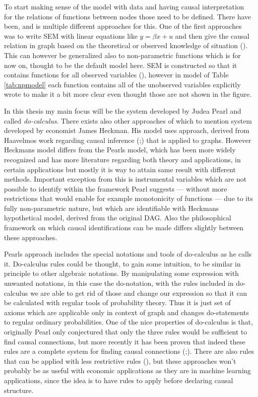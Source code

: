 \documentclass[main=english,12pt,a4paper,pdftex,econ,utf8]{aaltothesis}
\begin{document}
To start making sense of the model with data and having causal interpretation for the relations of functions between nodes those need to be defined. There have been, and is multiple different approaches for this. One of the first approaches was to write SEM with linear equations like $y=\beta x+u$ and then give the causal relation in graph based on the theoretical or observed knowledge of situation (\cite{Wright1921}). This can however be generalized also to non-parametric functions which is for now on, thought to be the default model here. SEM is constructed so that it contains functions for all observed variables (\cite{Pearl2008}), however in model of Table \ref{tab:npmodel} each function contains all of the unobserved variables explicitly wrote to make it a bit more clear even thought those are not shown in the figure.



In this thesis my main focus will be the system developed by Judea Pearl and called \textit{do-calculus}. There exists also other approaches of which to mention system developed by economist James Heckman. His model uses approach, derived from Haavelmos work regarding causal inference (\cite{Haavelmo1943};\cite{Haavelmo1944}) that is applied to graphs. However Heckmans model differs from the Pearls model, which has been more widely recognized and has more literature regarding both theory and applications, in certain applications but mostly it is way to attain same result with different methods. Important exception from this is instrumental variables which are not possible to identify within the framework Pearl suggests --- without more restrictions that would enable for example monotonicity of functions --- due to its fully non-parametric nature, but which are identifiable with Heckmans hypothetical model, derived from the original DAG. Also the philosophical framework on which causal identifications can be made differs slightly between these approaches.

Pearls approach includes the special notations and tools of do-calculus as he calls it. Do-calculus rules could be thought, to gain some intuition, to be similar in principle to other algebraic notations. By manipulating some expression with unwanted notations, in this case the do-notation, with the rules included in do-calculus we are able to get rid of those and change our expression so that it can be calculated with regular tools of probability theory. Thus it is just set of axioms which are applicable only in context of graph and changes do-statements to regular ordinary probabilities. One of the nice properties of do-calculus is that, originally Pearl only conjectured that only the three rules would be sufficient to find causal connections, but more recently it has been proven that indeed these rules are a complete system for finding causal connections (\cite{Shpitser2006};\cite{Huang2006}). There are also rules that can be applied with less restrictive rules (\cite{Hyttinen2015}), but these approaches won't probably be as useful with economic applications as they are in machine learning applications, since the idea is to have rules to apply before declaring causal structure.
\end{document}
